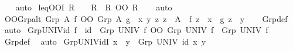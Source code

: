 \begin{isabellebody}
%
\isadelimproof
\ \ %
\endisadelimproof
%
\isatagproof
{}\isamarkupfalse%
\ auto%
\endisatagproof
{\isafoldproof}%
%
\isadelimproof
\isanewline
%
\endisadelimproof
\isanewline
{}\isamarkupfalse%
\ leq{\isacharunderscore}{\kern0pt}OOI{\isacharcolon}{\kern0pt}\ {\isachardoublequoteopen}R\ {\isacharequal}{\kern0pt}\ {\isacharparenleft}{\kern0pt}{\isacharequal}{\kern0pt}{\isacharparenright}{\kern0pt}\ {\isasymLongrightarrow}\ R\ {\isasymle}\ R\ OO\ R{\isachardoublequoteclose}\isanewline
%
\isadelimproof
\ \ %
\endisadelimproof
%
\isatagproof
{}\isamarkupfalse%
\ auto%
\endisatagproof
{\isafoldproof}%
%
\isadelimproof
\isanewline
%
\endisadelimproof
\isanewline
{}\isamarkupfalse%
\ OO{\isacharunderscore}{\kern0pt}Grp{\isacharunderscore}{\kern0pt}alt{\isacharcolon}{\kern0pt}\ {\isachardoublequoteopen}{\isacharparenleft}{\kern0pt}Grp\ A\ f{\isacharparenright}{\kern0pt}{\isasyminverse}{\isasyminverse}\ OO\ Grp\ A\ g\ {\isacharequal}{\kern0pt}\ {\isacharparenleft}{\kern0pt}{\isasymlambda}x\ y{\isachardot}{\kern0pt}\ {\isasymexists}z{\isachardot}{\kern0pt}\ z\ {\isasymin}\ A\ {\isasymand}\ f\ z\ {\isacharequal}{\kern0pt}\ x\ {\isasymand}\ g\ z\ {\isacharequal}{\kern0pt}\ y{\isacharparenright}{\kern0pt}{\isachardoublequoteclose}\isanewline
%
\isadelimproof
\ \ %
\endisadelimproof
%
\isatagproof
{}\isamarkupfalse%
\ Grp{\isacharunderscore}{\kern0pt}def\ \isamarkupfalse%
\ auto%
\endisatagproof
{\isafoldproof}%
%
\isadelimproof
\isanewline
%
\endisadelimproof
\isanewline
{}\isamarkupfalse%
\ Grp{\isacharunderscore}{\kern0pt}UNIV{\isacharunderscore}{\kern0pt}id{\isacharcolon}{\kern0pt}\ {\isachardoublequoteopen}f\ {\isacharequal}{\kern0pt}\ id\ {\isasymLongrightarrow}\ {\isacharparenleft}{\kern0pt}Grp\ UNIV\ f{\isacharparenright}{\kern0pt}{\isasyminverse}{\isasyminverse}\ OO\ Grp\ UNIV\ f\ {\isacharequal}{\kern0pt}\ Grp\ UNIV\ f{\isachardoublequoteclose}\isanewline
%
\isadelimproof
\ \ %
\endisadelimproof
%
\isatagproof
{}\isamarkupfalse%
\ Grp{\isacharunderscore}{\kern0pt}def\ \isamarkupfalse%
\ auto%
\endisatagproof
{\isafoldproof}%
%
\isadelimproof
\isanewline
%
\endisadelimproof
\isanewline
{}\isamarkupfalse%
\ Grp{\isacharunderscore}{\kern0pt}UNIV{\isacharunderscore}{\kern0pt}idI{\isacharcolon}{\kern0pt}\ {\isachardoublequoteopen}x\ {\isacharequal}{\kern0pt}\ y\ {\isasymLongrightarrow}\ Grp\ UNIV\ id\ x\ y{\isachardoublequoteclose}\isanewline
%
\isadelimproof
\ \ %
\endisadelimproof
%
\isatagproof
{}\isamarkupfalse%

\end{isabellebody}
